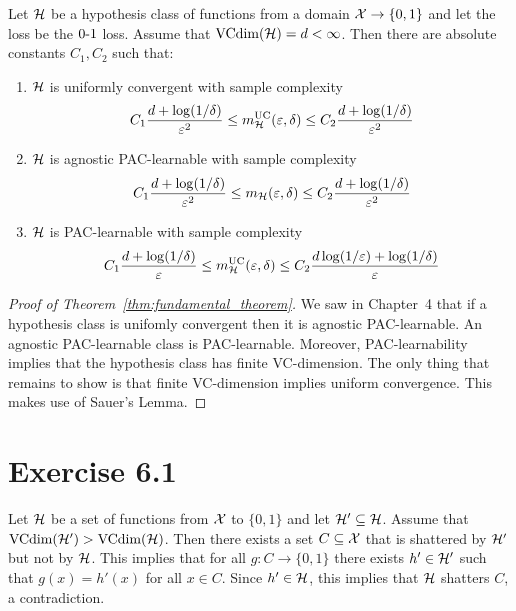 \begin{theorem}
Let $\mathcal{H}$ be a hypothesis class of functions from a domain
$\mathcal{X} \rightarrow \{0, 1\}$ and let the loss be the $\operatorname{0-1}$ loss. Assume that
$\text{VCdim}(\mathcal{H}) = d < \infty$. Then there are absolute constants $C_1, C_2$
such that:
\begin{enumerate}
    \item $\mathcal{H}$ is uniformly convergent with sample complexity
        \[
            C_1 \frac{d + \log (1 / \delta)}{\varepsilon^2}
            \leq m_{\mathcal{H}}^{\text{UC}}(\varepsilon, \delta)
            \leq C_2 \frac{d + \log (1 / \delta)}{\varepsilon^2}
        \]
    \item $\mathcal{H}$ is agnostic PAC-learnable with sample complexity
        \[
            C_1 \frac{d + \log (1 / \delta)}{\varepsilon^2}
            \leq m_{\mathcal{H}}(\varepsilon, \delta)
            \leq C_2 \frac{d + \log (1 / \delta)}{\varepsilon^2}
        \]
    \item $\mathcal{H}$ is PAC-learnable with sample complexity
        \[
            C_1 \frac{d + \log (1 / \delta)}{\varepsilon}
            \leq m_{\mathcal{H}}^{\text{UC}}(\varepsilon, \delta)
            \leq C_2 \frac{d \log (1 / \varepsilon) + \log (1 / \delta)}{\varepsilon}
        \]
\end{enumerate}
\end{theorem}

\begin{proof}[Proof of Theorem~\ref{thm:fundamental_theorem}]
We saw in Chapter~4 that if a hypothesis class is unifomly convergent then it is
agnostic PAC-learnable. An agnostic PAC-learnable class is PAC-learnable. Moreover,
PAC-learnability implies that the hypothesis class has finite VC-dimension. The only
thing that remains to show is that finite VC-dimension implies uniform convergence.
This makes use of Sauer's Lemma.
\end{proof}
\section*{Exercise 6.1}

Let $\mathcal{H}$ be a set of functions from $\mathcal{X}$ to $\{0, 1\}$ and
let $\mathcal{H}' \subseteq \mathcal{H}$. Assume that $\text{VCdim} (\mathcal{H}') > \text{VCdim}
(\mathcal{H})$.  Then there exists a set $C \subseteq \mathcal{X}$ that is shattered by
$\mathcal{H}'$ but not by $\mathcal{H}$.  This implies that for all $g \colon C
\rightarrow \{0, 1\}$ there exists $h' \in \mathcal{H}'$ such that $g(x) = h'(x)$
for all $x \in C$. Since $h' \in \mathcal{H}$, this implies that $\mathcal{H}$
shatters $C$, a contradiction.

